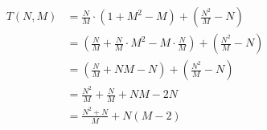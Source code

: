 \documentclass[parskip=half,a4paper]{scrartcl}
\begin{document}
\begin{equation*}
\begin{aligned}
    T(N, M) & =  \frac{N}{M} \cdot (1 + M^2 - M) + (\frac{N^2}{M} - N) \\
    & =  (\frac{N}{M} + \frac{N}{M} \cdot M^2 - M \cdot \frac{N}{M}) + (\frac{N^2}{M} - N) \\
    & =  (\frac{N}{M} + NM - N) + (\frac{N^2}{M} - N) \\
    & =  \frac{N^2}{M} + \frac{N}{M} + NM - 2N \\
    & =  \frac{N^2 + N}{M} + N (M-2) \\
\end{aligned}
\end{equation*}
\end{document}
